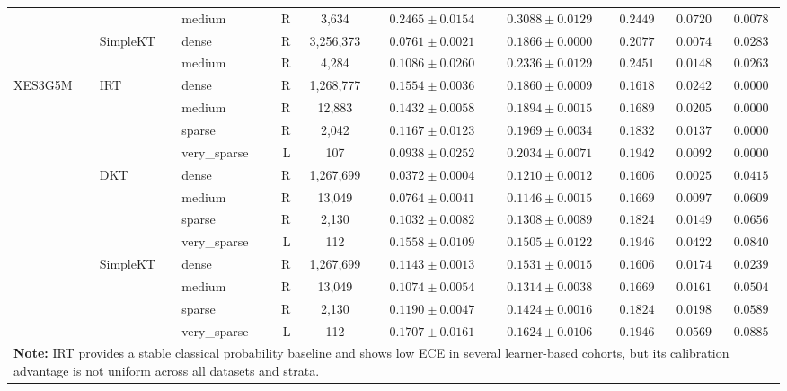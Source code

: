\begin{table}[H]
{\begin{tabular}{lllrcccccc}
 &  & medium & R & 3,634 & $0.2465 \pm 0.0154$ & $0.3088 \pm 0.0129$ & $0.2449$ & $0.0720$ & $0.0078$ \\
 & SimpleKT & dense & R & 3,256,373 & $0.0761 \pm 0.0021$ & $0.1866 \pm 0.0000$ & $0.2077$ & $0.0074$ & $0.0283$ \\
 &  & medium & R & 4,284 & $0.1086 \pm 0.0260$ & $0.2336 \pm 0.0129$ & $0.2451$ & $0.0148$ & $0.0263$ \\
\midrule
XES3G5M & IRT & dense & R & 1,268,777 & $0.1554 \pm 0.0036$ & $0.1860 \pm 0.0009$ & $0.1618$ & $0.0242$ & $0.0000$ \\
 &  & medium & R & 12,883 & $0.1432 \pm 0.0058$ & $0.1894 \pm 0.0015$ & $0.1689$ & $0.0205$ & $0.0000$ \\
 &  & sparse & R & 2,042 & $0.1167 \pm 0.0123$ & $0.1969 \pm 0.0034$ & $0.1832$ & $0.0137$ & $0.0000$ \\
 &  & very\_sparse & L & 107 & $0.0938 \pm 0.0252$ & $0.2034 \pm 0.0071$ & $0.1942$ & $0.0092$ & $0.0000$ \\
 & DKT & dense & R & 1,267,699 & $0.0372 \pm 0.0004$ & $0.1210 \pm 0.0012$ & $0.1606$ & $0.0025$ & $0.0415$ \\
 &  & medium & R & 13,049 & $0.0764 \pm 0.0041$ & $0.1146 \pm 0.0015$ & $0.1669$ & $0.0097$ & $0.0609$ \\
 &  & sparse & R & 2,130 & $0.1032 \pm 0.0082$ & $0.1308 \pm 0.0089$ & $0.1824$ & $0.0149$ & $0.0656$ \\
 &  & very\_sparse & L & 112 & $0.1558 \pm 0.0109$ & $0.1505 \pm 0.0122$ & $0.1946$ & $0.0422$ & $0.0840$ \\
 & SimpleKT & dense & R & 1,267,699 & $0.1143 \pm 0.0013$ & $0.1531 \pm 0.0015$ & $0.1606$ & $0.0174$ & $0.0239$ \\
 &  & medium & R & 13,049 & $0.1074 \pm 0.0054$ & $0.1314 \pm 0.0038$ & $0.1669$ & $0.0161$ & $0.0504$ \\
 &  & sparse & R & 2,130 & $0.1190 \pm 0.0047$ & $0.1424 \pm 0.0016$ & $0.1824$ & $0.0198$ & $0.0589$ \\
 &  & very\_sparse & L & 112 & $0.1707 \pm 0.0161$ & $0.1624 \pm 0.0106$ & $0.1946$ & $0.0569$ & $0.0885$ \\
\bottomrule
\multicolumn{10}{p{17.5cm}}{\scriptsize \textbf{Note:} IRT provides a stable classical probability baseline and shows low ECE in several learner-based cohorts, but its calibration advantage is not uniform across all datasets and strata.} \\
\end{tabular}%
}
\end{table}
